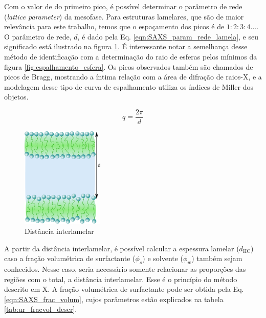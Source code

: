 		Com o valor de \q{} do primeiro pico, é possível determinar o parâmetro de rede (\emph{lattice parameter}) da mesofase. Para estruturas lamelares, que são de maior relevância para este trabalho, temos que o espaçamento dos picos é de \(1:2:3:4...\). O parâmetro de rede, \(d\),  é dado pela Eq. \ref{eqn:SAXS_param_rede_lamela}, e seu significado está ilustrado na figura \ref{fig:saxs_distancia_interlamelar}. É interessante notar a semelhança desse método de identificação com a determinação do raio de esferas pelos mínimos da figura \ref{fig:espalhamento_esfera}. Os picos observados também são chamados de picos de Bragg, mostrando a íntima relação com a área de difração de raios-X, e a modelagem desse tipo de curva de espalhamento utiliza os índices de Miller dos objetos.
	
		\begin{equation}
			q = \dfrac{2\pi}{d}
			\label{eqn:SAXS_param_rede_lamela}
		\end{equation} 
		
	
		\begin{figure}[h]
			\centering
			\includegraphics[width=0.35\textwidth]{imagens/saxs/distancia_interlamelar}
			\caption{Distância interlamelar}
			\label{fig:saxs_distancia_interlamelar}
		\end{figure}

		A partir da distância interlamelar, é possível calcular a espessura lamelar (\(d_{\text{HC}}\)) caso a fração volumétrica de surfactante (\(\phi_s\)) e solvente (\(\phi_w\)) também sejam conhecidos. Nesse caso, seria necessário somente relacionar as proporções das regiões com o total, a distância interlamelar. Esse é o princípio do método descrito em X. A fração volumétrica de surfactante pode ser obtida pela Eq. \ref{eqn:SAXS_frac_volum}, cujos parâmetros estão explicados na tabela \ref{tab:ur_fracvol_descr}. 
		
